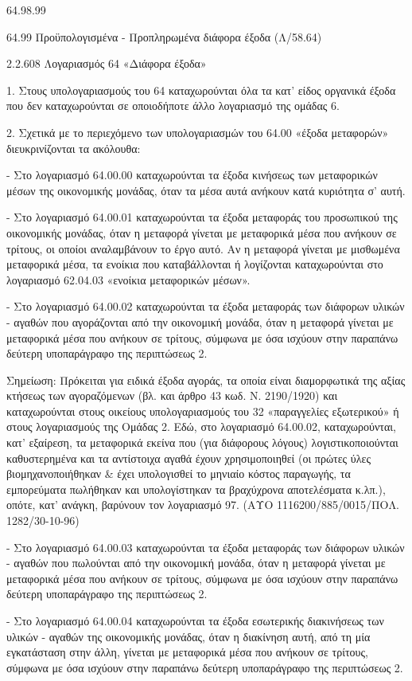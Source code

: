 \documentclass[A4,10pt,greek]{book}
\begin{document}
                       64.98.99

64.99 Προϋπολογισμένα - Προπληρωμένα διάφορα έξοδα (Λ/58.64)

2.2.608 Λογαριασμός 64 «Διάφορα έξοδα»

1. Στους υπολογαριασμούς του 64 καταχωρούνται όλα τα κατ' είδος οργανικά έξοδα που δεν καταχωρούνται σε οποιοδήποτε άλλο λογαριασμό της ομάδας 6.

2. Σχετικά με το περιεχόμενο των υπολογαριασμών του 64.00 «έξοδα μεταφορών» διευκρινίζονται τα ακόλουθα:

- Στο λογαριασμό 64.00.00 καταχωρούνται τα έξοδα κινήσεως των μεταφορικών μέσων της οικονομικής μονάδας, όταν τα μέσα αυτά ανήκουν κατά κυριότητα σ' αυτή.

- Στο λογαριασμό 64.00.01 καταχωρούνται τα έξοδα μεταφοράς του προσωπικού της οικονομικής μονάδας, όταν η μεταφορά γίνεται με μεταφορικά μέσα που ανήκουν σε τρίτους, οι οποίοι αναλαμβάνουν το έργο αυτό. Αν η μεταφορά γίνεται με μισθωμένα μεταφορικά μέσα, τα ενοίκια που καταβάλλονται ή λογίζονται καταχωρούνται στο λογαριασμό 62.04.03 «ενοίκια μεταφορικών μέσων».

- Στο λογαριασμό 64.00.02 καταχωρούνται τα έξοδα μεταφοράς των διάφορων υλικών - αγαθών που αγοράζονται από την οικονομική μονάδα, όταν η μεταφορά γίνεται με μεταφορικά μέσα που ανήκουν σε τρίτους, σύμφωνα με όσα ισχύουν στην παραπάνω δεύτερη υποπαράγραφο της περιπτώσεως 2.

Σημείωση: Πρόκειται για ειδικά έξοδα αγοράς, τα οποία είναι διαμορφωτικά της αξίας κτήσεως των αγοραζόμενων (βλ. και άρθρο 43 κωδ. Ν. 2190/1920) και καταχωρούνται στους οικείους υπολογαριασμούς του 32 «παραγγελίες εξωτερικού» ή στους λογαριασμούς της Ομάδας 2. Εδώ, στο λογαριασμό 64.00.02, καταχωρούνται, κατ' εξαίρεση, τα μεταφορικά εκείνα που (για διάφορους λόγους) λογιστικοποιούνται καθυστερημένα και τα αντίστοιχα αγαθά έχουν χρησιμοποιηθεί (οι πρώτες ύλες βιομηχανοποιήθηκαν \& έχει υπολογισθεί το μηνιαίο κόστος παραγωγής, τα εμπορεύματα πωλήθηκαν και υπολογίστηκαν τα βραχύχρονα αποτελέσματα κ.λπ.), οπότε, κατ' ανάγκη, βαρύνουν τον λογαριασμό 97. (ΑΥΟ 1116200/885/0015/ΠΟΛ. 1282/30-10-96)

- Στο λογαριασμό 64.00.03 καταχωρούνται τα έξοδα μεταφοράς των διάφορων υλικών - αγαθών που πωλούνται από την οικονομική μονάδα, όταν η μεταφορά γίνεται με μεταφορικά μέσα που ανήκουν σε τρίτους, σύμφωνα με όσα ισχύουν στην παραπάνω δεύτερη υποπαράγραφο της περιπτώσεως 2.

- Στο λογαριασμό 64.00.04 καταχωρούνται τα έξοδα εσωτερικής διακινήσεως των υλικών - αγαθών της οικονομικής μονάδας, όταν η διακίνηση αυτή, από τη μία εγκατάσταση στην άλλη, γίνεται με μεταφορικά μέσα που ανήκουν σε τρίτους, σύμφωνα με όσα ισχύουν στην παραπάνω δεύτερη υποπαράγραφο της περιπτώσεως 2.
\end{document}
